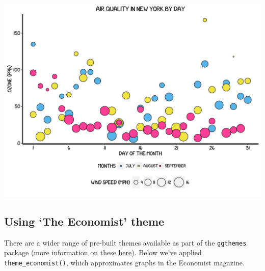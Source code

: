 \documentclass[]{article}
\begin{document}
\begin{center}\includegraphics{0_all_posts_pdf/wscatter_18-1} \end{center}

\subsection{\texorpdfstring{Using `The Economist'
theme}{Using The Economist theme}}\label{using-the-economist-theme-5}

There are a wider range of pre-built themes available as part of the
\texttt{ggthemes} package (more information on these
\href{https://cran.r-project.org/web/packages/ggthemes/vignettes/ggthemes.html}{here}).
Below we've applied \texttt{theme\_economist()}, which approximates
graphs in the Economist magazine.
\end{document}
